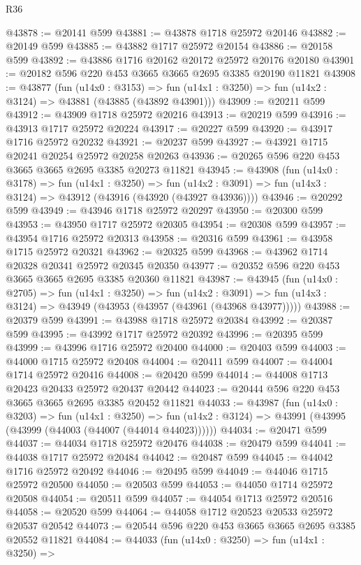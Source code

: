 \begin{lexlean}{R36}
\begin{coremodule}
@43878 := @20141 @599
@43881 := @43878 @1718 @25972 @20146
@43882 := @20149 @599
@43885 := @43882 @1717 @25972 @20154
@43886 := @20158 @599
@43892 := @43886 @1716 @20162 @20172 @25972 @20176 @20180
@43901 := @20182 @596 @220 @453 @3665 @3665 @2695 @3385 @20190 @11821
@43908 := @43877
    (fun (u14x0 : @3153) =>
    fun (u14x1 : @3250) => fun (u14x2 : @3124) => @43881 (@43885 (@43892 @43901)))
@43909 := @20211 @599
@43912 := @43909 @1718 @25972 @20216
@43913 := @20219 @599
@43916 := @43913 @1717 @25972 @20224
@43917 := @20227 @599
@43920 := @43917 @1716 @25972 @20232
@43921 := @20237 @599
@43927 := @43921 @1715 @20241 @20254 @25972 @20258 @20263
@43936 := @20265 @596 @220 @453 @3665 @3665 @2695 @3385 @20273 @11821
@43945 := @43908
    (fun (u14x0 : @3178) =>
    fun (u14x1 : @3250) =>
    fun (u14x2 : @3091) => fun (u14x3 : @3124) => @43912 (@43916 (@43920 (@43927 @43936))))
@43946 := @20292 @599
@43949 := @43946 @1718 @25972 @20297
@43950 := @20300 @599
@43953 := @43950 @1717 @25972 @20305
@43954 := @20308 @599
@43957 := @43954 @1716 @25972 @20313
@43958 := @20316 @599
@43961 := @43958 @1715 @25972 @20321
@43962 := @20325 @599
@43968 := @43962 @1714 @20328 @20341 @25972 @20345 @20350
@43977 := @20352 @596 @220 @453 @3665 @3665 @2695 @3385 @20360 @11821
@43987 := @43945
    (fun (u14x0 : @2705) =>
    fun (u14x1 : @3250) =>
    fun (u14x2 : @3091) => fun (u14x3 : @3124) => @43949 (@43953 (@43957 (@43961 (@43968 @43977)))))
@43988 := @20379 @599
@43991 := @43988 @1718 @25972 @20384
@43992 := @20387 @599
@43995 := @43992 @1717 @25972 @20392
@43996 := @20395 @599
@43999 := @43996 @1716 @25972 @20400
@44000 := @20403 @599
@44003 := @44000 @1715 @25972 @20408
@44004 := @20411 @599
@44007 := @44004 @1714 @25972 @20416
@44008 := @20420 @599
@44014 := @44008 @1713 @20423 @20433 @25972 @20437 @20442
@44023 := @20444 @596 @220 @453 @3665 @3665 @2695 @3385 @20452 @11821
@44033 := @43987
    (fun (u14x0 : @3203) =>
    fun (u14x1 : @3250) =>
    fun (u14x2 : @3124) => @43991 (@43995 (@43999 (@44003 (@44007 (@44014 @44023))))))
@44034 := @20471 @599
@44037 := @44034 @1718 @25972 @20476
@44038 := @20479 @599
@44041 := @44038 @1717 @25972 @20484
@44042 := @20487 @599
@44045 := @44042 @1716 @25972 @20492
@44046 := @20495 @599
@44049 := @44046 @1715 @25972 @20500
@44050 := @20503 @599
@44053 := @44050 @1714 @25972 @20508
@44054 := @20511 @599
@44057 := @44054 @1713 @25972 @20516
@44058 := @20520 @599
@44064 := @44058 @1712 @20523 @20533 @25972 @20537 @20542
@44073 := @20544 @596 @220 @453 @3665 @3665 @2695 @3385 @20552 @11821
@44084 := @44033
    (fun (u14x0 : @3250) =>
    fun (u14x1 : @3250) =>

\end{coremodule}
\end{lexlean}
